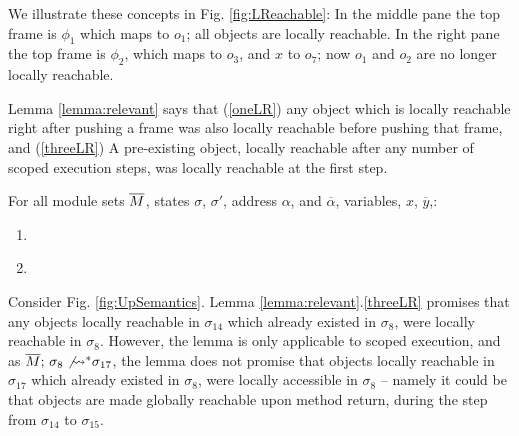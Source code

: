 We illustrate these concepts in Fig. \ref{fig:LReachable}:  In the middle pane the top frame is $\phi_1$ which maps  to $o_1$; all objects are locally reachable. 
In the right pane the top frame is $\phi_2$, which maps  to $o_3$, and $x$ to $o_7$; now $o_1$ and $o_2$ are no longer locally reachable.

Lemma  \ref{lemma:relevant} %
says that 
(\ref{oneLR}) any object which is locally reachable right after pushing a frame was also locally reachable before pushing that frame, and 
(\ref{threeLR}) A pre-existing object, locally reachable after any number of scoped execution steps, was locally reachable at the first step.

\begin{lemma}
\label{lemma:relevant}
\label{lemma:push:N}
For all module sets $\overline{M}$, states $\sigma$, $\sigma'$,   address $\alpha$, and $\overline \alpha$, variables, $x$, $\overline {y}$,:
\begin{enumerate}
\item
\label{oneLR}
\item
\label{threeLR}
\sdN{${\leadstoBoundedStar {\Mtwo}  {\sigma}    {\sigma'}}  \ \  \Longrightarrow\ \ 
dom(\sigma) \cap \LRelevantO {\sigma'} \subseteq   \LRelevantO {\sigma}$
}

\end{enumerate}
\end{lemma}

{Consider Fig.  \ref{fig:UpSemantics}. %
Lemma \ref{lemma:relevant}.\ref{threeLR}  promises that any objects locally reachable in $\sigma_{14}$ which already existed in $\sigma_{8}$, were locally reachable in $\sigma_{8}$. However, the lemma is only  applicable to scoped execution, and as 
$\overline{M};\, {\sigma_8} \not{\rightsquigarrow^*} \sigma_{17}$, 
the lemma does not promise that  objects locally reachable in $\sigma_{17}$ which already existed in $\sigma_{8}$, were locally accessible in $\sigma_{8}$ -- namely it could be that objects are made globally reachable upon method return, during the step from $\sigma_{14}$ to $\sigma_{15}$.}

 
  
